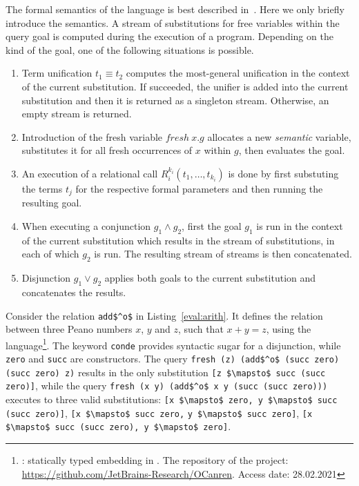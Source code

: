 The formal semantics of the language is best described in~\cite{rozplokhas2020certified}.
Here we only briefly introduce the semantics.
A stream of substitutions for free variables within the query goal is computed during the execution of a \mk program.
Depending on the kind of the goal, one of the following situations is possible.

\begin{enumerate}
  \item Term unification $t_1 \equiv t_2$ computes the most-general unification in the context of the current substitution. If succeeded, the unifier is added into the current substitution and then it is returned as a singleton stream. Otherwise, an empty stream is returned.
  \item Introduction of the fresh variable $fresh \ x. g$ allocates a new \emph{semantic} variable, substitutes it for all fresh occurrences of $x$ within $g$, then evaluates the goal.
  \item An execution of a relational call $R^{k_i}_i(t_1, \dots, t_{k_i})$ is done by first substuting the terms $t_j$ for the respective formal parameters and then running the resulting goal.
  \item When executing a conjunction $g_1 \wedge g_2$, first the goal $g_1$ is run in the context of the current substitution which results in the stream of substitutions, in each of which $g_2$ is run. The resulting stream of streams is then concatenated.
  \item Disjunction $g_1 \vee g_2$ applies both goals to the current substitution and concatenates the results.
\end{enumerate}

Consider the relation \lstinline{add$^o$} in Listing~\ref{eval:arith}.
It defines the relation between three Peano numbers $x$, $y$ and $z$, such that $x + y = z$, using the \oc language\footnote{\oc: statically typed \mk embedding in \ocaml. The repository of the project: \url{https://github.com/JetBrains-Research/OCanren}. Access date: 28.02.2021}.
The keyword \lstinline{conde} provides syntactic sugar for a disjunction, while \lstinline{zero} and \lstinline{succ} are constructors.
The query \lstinline{fresh (z) (add$^o$ (succ zero) (succ zero) z)} results in the only substitution \lstinline{[z $\mapsto$ succ (succ zero)]}, while the query \lstinline{fresh (x y) (add$^o$ x y (succ (succ zero)))} executes to three valid substitutions: \lstinline{[x $\mapsto$ zero, y $\mapsto$ succ (succ zero)]}, \lstinline{[x $\mapsto$ succ zero,} \lstinline{y $\mapsto$ succ zero]}, \lstinline{[x $\mapsto$ succ (succ zero), y $\mapsto$ zero]}.

